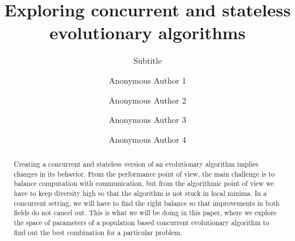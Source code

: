 \documentclass[sigconf]{acmart}
\begin{document}
\title{Exploring concurrent and stateless evolutionary algorithms}
\subtitle{Subtitle}

  \author{Anonymous Author 1}
  
  \author{Anonymous Author 2}

  \author{Anonymous Author 3}

  \author{Anonymous Author 4}
  
  \renewcommand{\shortauthors}{A. Author et al.}


\begin{abstract}
  Creating a concurrent and stateless version of an evolutionary algorithm implies
  changes in its behavior. From the performance point of view, the main challenge is to balance computation
  with communication, but from the algorithmic point of view we have to
  keep diversity high so that the algorithm is not stuck in local
  minima. In a concurrent setting, we will have to find the right
  balance so that improvements in both fields do not cancel out. This is
  what we will be doing in this paper, where we explore the space of
  parameters of a population based concurrent evolutionary algorithm to
  find out the best combination for a particular problem.\end{abstract}
\end{document}

